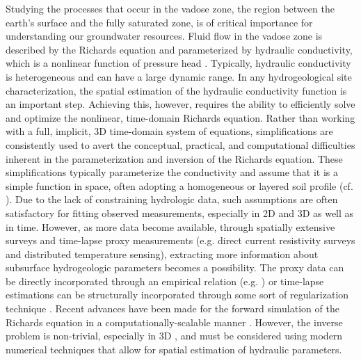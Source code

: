 \documentclass[preprint,review,3p,times,onecolumn,authoryear]{elsarticle}
\begin{document}
Studying the processes that occur in the vadose zone, the region between the earth's surface and the fully saturated zone, is of critical importance for understanding our  groundwater resources. Fluid flow in the vadose zone is described by the Richards equation and parameterized by hydraulic conductivity, which is a nonlinear function of pressure head \citep{Richards1931, Celia1990}. Typically, hydraulic conductivity is heterogeneous and can have a large dynamic range. In any hydrogeological site characterization, the spatial estimation of the hydraulic conductivity function is an important step. Achieving this, however, requires the ability to efficiently solve and optimize the nonlinear, time-domain Richards equation. Rather than working with a full, implicit, 3D time-domain system of equations, simplifications are consistently used to avert the conceptual, practical, and computational difficulties inherent in the parameterization and inversion of the Richards equation. These simplifications typically parameterize the conductivity and assume that it is a simple function in space, often adopting a homogeneous or layered soil profile (cf. \cite{Binley2002, Deiana2007, Hinnell2010, Liang2014}). Due to the lack of constraining hydrologic data, such assumptions are often satisfactory for fitting observed measurements, especially in 2D and 3D as well as in time. However, as more data become available, through spatially extensive surveys and time-lapse proxy measurements (e.g. direct current resistivity surveys and distributed temperature sensing), extracting more information about subsurface hydrogeologic parameters becomes a possibility. The proxy data can be directly incorporated through an empirical relation (e.g. \cite{Archie1942}) or time-lapse estimations can be structurally incorporated through some sort of regularization technique \citep{HaberHoltzman2013, ho, Hinnell2010}. Recent advances have been made for the forward simulation of the Richards equation in a computationally-scalable manner \citep{RichardsFOAM}. However, the inverse problem is non-trivial, especially in 3D \citep{Towara2015, Linde2016}, and must be considered using modern numerical techniques that allow for spatial estimation of hydraulic parameters.
\end{document}
